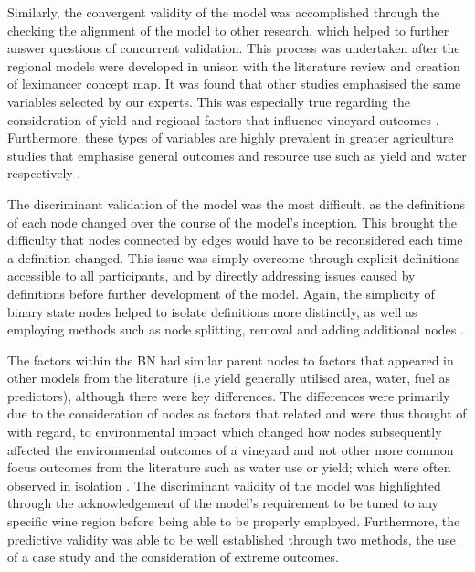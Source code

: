 Similarly, the convergent validity of the model was accomplished through the checking the alignment of the model to other research, which helped to further answer questions of concurrent validation. This process was undertaken after the regional models were developed in unison with the literature review and creation of leximancer concept map. It was found that other studies emphasised the same variables selected by our experts. This was especially true regarding the consideration of yield and regional factors that influence vineyard outcomes \cite{abbalDecisionSupportSystem2016,campsGrapeHarvestYield2012,hallWithinseasonTemporalVariation2011}. Furthermore, these types of variables are highly prevalent in greater agriculture studies that emphasise general outcomes and resource use such as yield and water respectively \citep{heFruitYieldPrediction2022,laurentLocalInfluenceClimate2022}.

The discriminant validation of the model was the most difficult, as the definitions of each node changed over the course of the model's inception. This brought the difficulty that nodes connected by edges would have to be reconsidered each time a definition changed. This issue was simply overcome through explicit definitions accessible to all participants, and by directly addressing issues caused by definitions before further development of the model. Again, the simplicity of binary state nodes helped to isolate definitions more distinctly, as well as employing methods such as node splitting, removal and adding additional nodes \citep{korbBayesianArtificialIntelligence2011}.

The factors within the BN had similar parent nodes to factors that appeared in other models from the literature (i.e yield generally utilised area, water, fuel as predictors), although there were key differences. The differences were primarily due to the consideration of nodes as factors that related and were thus thought of with regard, to environmental impact which changed how nodes subsequently affected the environmental outcomes of a vineyard and not other more common focus outcomes from the literature such as water use or yield; which were often observed in isolation \citep{laurentReviewIssuesMethods2021}. The discriminant validity of the model was highlighted through the acknowledgement of the model's requirement to be tuned to any specific wine region before being able to be properly employed. Furthermore, the predictive validity was able to be well established through two methods, the use of a case study and the consideration of extreme outcomes.

